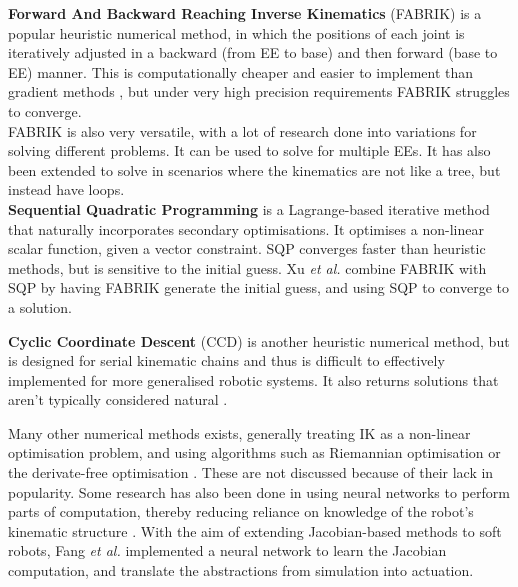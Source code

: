 

\textbf{Forward And Backward Reaching Inverse Kinematics} (FABRIK) is a popular heuristic numerical method, in which the positions of each joint is iteratively adjusted in a backward (from EE to base) and then forward (base to EE) manner. This is computationally cheaper and easier to implement than gradient methods \cite{bib:ik_FABRIK}, but under very high precision requirements FABRIK struggles to converge.\\
FABRIK is also very versatile, with a lot of research done into variations for solving different problems. It can be used to solve for multiple EEs. It has also been extended to solve in scenarios where the kinematics are not like a tree, but instead have loops.\\
\textbf{Sequential Quadratic Programming} is a Lagrange-based iterative method \cite{bib:ik_SQP} that naturally incorporates secondary optimisations. It optimises a non-linear scalar function, given a vector constraint. SQP converges faster than heuristic methods, but is sensitive to the initial guess. Xu \textit{et al.} \cite{bib:ik_FABRIK_with_SQP} combine FABRIK with SQP by having FABRIK generate the initial guess, and using SQP to converge to a solution.


\textbf{Cyclic Coordinate Descent} (CCD) is another heuristic numerical method, but is designed for serial kinematic chains and thus is difficult to effectively implemented for more generalised robotic systems. It also returns solutions that aren't typically considered natural \cite{bib:ik_FABRIK}.

\newpage
Many other numerical methods exists, generally treating IK as a non-linear optimisation problem, and using algorithms such as Riemannian optimisation or the derivate-free optimisation \cite{bib:ik_FABRIK_with_SQP}. These are not discussed because of their lack in popularity. Some research has also been done in using neural networks to perform parts of computation, thereby reducing reliance on knowledge of the robot's kinematic structure \cite{bib:ik_FABRIK_with_SQP}\cite{bib:ik_FABRIK_with_ANN}. With the aim of extending Jacobian-based methods to soft robots, Fang \textit{et al.} \cite{bib:ik_soft_robots} implemented a neural network to learn the Jacobian computation, and translate the abstractions from simulation into actuation.

